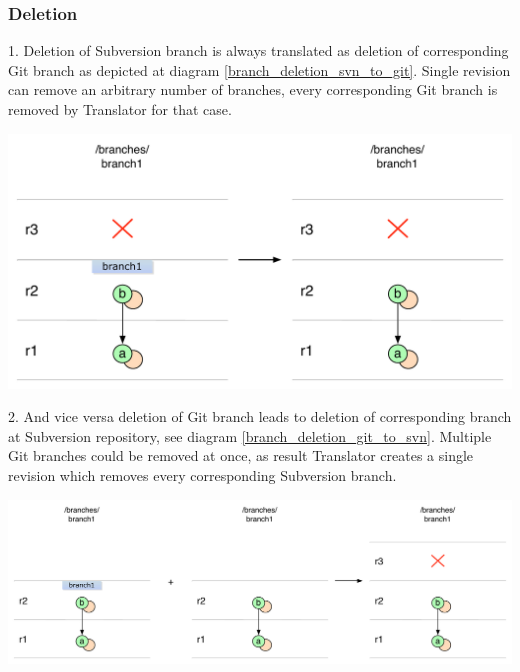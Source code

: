 \subsubsection{Deletion}

1. Deletion of Subversion branch is always translated as deletion of corresponding Git branch as depicted at diagram \ref{branch_deletion_svn_to_git}. Single revision can remove an arbitrary number of branches, every corresponding Git branch is removed by Translator for that case.
\begin{center}
\includegraphics[width=\textwidth]{img/diagrams/branch_deletion_svn_to_git.pdf}%
\label{branch_deletion_svn_to_git}%
\end{center}

2. And vice versa deletion of Git branch leads to deletion of corresponding branch at Subversion repository, see diagram \ref{branch_deletion_git_to_svn}. Multiple Git branches could be removed at once, as result Translator creates a single revision which removes every corresponding Subversion branch.
\begin{center}
\includegraphics[width=\textwidth]{img/diagrams/branch_deletion_git_to_svn.pdf}%
\label{branch_deletion_git_to_svn}%
\end{center}

